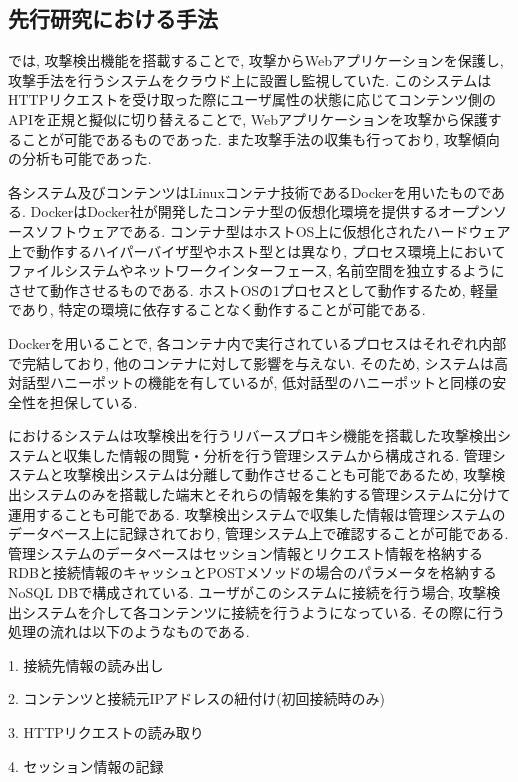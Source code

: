 \documentclass[submit,techrep,noauthor]{ipsj}
\begin{document}
\subsection{先行研究における手法}
\cite{label2}では, 攻撃検出機能を搭載することで, 攻撃からWebアプリケーションを保護し, 攻撃手法を行うシステムをクラウド上に設置し監視していた. このシステムはHTTPリクエストを受け取った際にユーザ属性の状態に応じてコンテンツ側のAPIを正規と擬似に切り替えることで, Webアプリケーションを攻撃から保護することが可能であるものであった. また攻撃手法の収集も行っており, 攻撃傾向の分析も可能であった.\par
各システム及びコンテンツはLinuxコンテナ技術であるDockerを用いたものである. Docker\cite{label7}はDocker社が開発したコンテナ型の仮想化環境を提供するオープンソースソフトウェアである. コンテナ型はホストOS上に仮想化されたハードウェア上で動作するハイパーバイザ型やホスト型とは異なり, プロセス環境上においてファイルシステムやネットワークインターフェース, 名前空間を独立するようにさせて動作させるものである. ホストOSの1プロセスとして動作するため, 軽量であり, 特定の環境に依存することなく動作することが可能である.\par
Dockerを用いることで, 各コンテナ内で実行されているプロセスはそれぞれ内部で完結しており, 他のコンテナに対して影響を与えない. そのため, システムは高対話型ハニーポットの機能を有しているが, 低対話型のハニーポットと同様の安全性を担保している. \par
\cite{label2}におけるシステムは攻撃検出を行うリバースプロキシ機能を搭載した攻撃検出システムと収集した情報の閲覧・分析を行う管理システムから構成される. 管理システムと攻撃検出システムは分離して動作させることも可能であるため, 攻撃検出システムのみを搭載した端末とそれらの情報を集約する管理システムに分けて運用することも可能である. 攻撃検出システムで収集した情報は管理システムのデータベース上に記録されており, 管理システム上で確認することが可能である. 管理システムのデータベースはセッション情報とリクエスト情報を格納するRDBと接続情報のキャッシュとPOSTメソッドの場合のパラメータを格納するNoSQL DBで構成されている.
ユーザがこのシステムに接続を行う場合, 攻撃検出システムを介して各コンテンツに接続を行うようになっている. その際に行う処理の流れは以下のようなものである.\par
\vspace{1pc}
1. 接続先情報の読み出し\par
2. コンテンツと接続元IPアドレスの紐付け(初回接続時のみ)\par
3. HTTPリクエストの読み取り\par
4. セッション情報の記録\par
\end{document}
